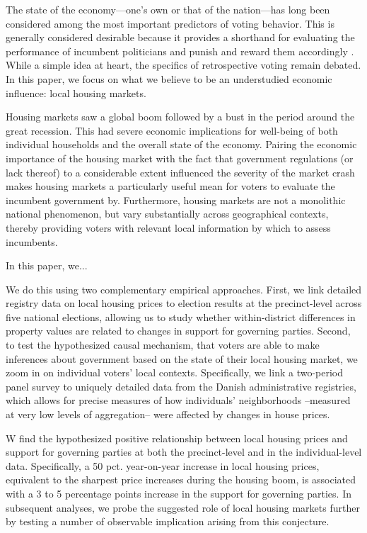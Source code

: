 \documentclass[12pt,a4paper]{article}
\begin{document}
The state of the economy—one’s own or that of the nation—has long been considered among the most important predictors of voting behavior. This is generally considered desirable because it provides a shorthand for evaluating the performance of incumbent politicians and punish and reward them accordingly \citep{healy2013retrospective}. While a simple idea at heart, the specifics of retrospective voting remain debated. In this paper, we focus on what we believe to be an understudied economic influence: local housing markets. 

Housing markets saw a global boom followed by a bust in the period around the great recession. This had severe economic implications for well-being of both individual households and the overall state of the economy. Pairing the economic importance of the housing market with the fact that government regulations (or lack thereof) to a considerable extent influenced the severity of the market crash makes housing markets a particularly useful mean for voters to evaluate the incumbent government by. Furthermore, housing markets are not a monolithic national phenomenon, but vary substantially across geographical contexts, thereby providing voters with relevant local information by which to assess incumbents. 

In this paper, we...

We do this using two complementary empirical approaches. First, we link detailed registry data on local housing prices to election results at the precinct-level across five national elections, allowing us to study whether within-district differences in property values are related to changes in support for governing parties. Second, to test the hypothesized causal mechanism, that voters are able to make inferences about government based on the state of their local housing market, we zoom in on individual voters' local contexts. Specifically, we link a two-period panel survey to uniquely detailed data from the Danish administrative registries, which allows for precise measures of how individuals' neighborhoods --measured at very low levels of aggregation-- were affected by changes in house prices.

W find the hypothesized positive relationship between local housing prices and support for governing parties at both the precinct-level and in the individual-level data. Specifically, a 50 pct. year-on-year increase in local housing prices, equivalent to the sharpest price increases during the housing boom, is associated with a 3 to 5 percentage points increase in the support for governing parties. In subsequent analyses, we probe the suggested role of local housing markets further by testing a number of observable implication arising from this conjecture. 
\end{document}
